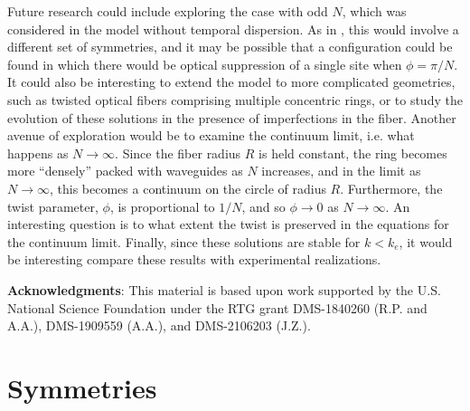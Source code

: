 \documentclass[11pt,reqno]{amsart}
\begin{document}
Future research could include exploring the case with odd $N$, which was considered in the model without temporal dispersion. As in \cite{parker2021}, this would involve a different set of symmetries, and it may be possible that a configuration could be found in which there would be optical suppression of a single site when $\phi = \pi/N$. It could also be interesting to extend the model to more complicated geometries, such as twisted optical fibers comprising multiple concentric rings, or to study the evolution of these solutions in the presence of imperfections in the fiber. Another avenue of exploration would be to examine the continuum limit, i.e. what happens as $N \rightarrow \infty$. Since the fiber radius $R$ is held constant, the ring becomes more ``densely'' packed with waveguides as $N$ increases, and in the limit as $N \rightarrow \infty$, this becomes a continuum on the circle of radius $R$. Furthermore, the twist parameter, $\phi$, is proportional to $1/N$, and so $\phi \rightarrow 0$ as $N \rightarrow \infty$. An interesting question is to what extent the twist is preserved in the equations for the continuum limit. Finally, since these solutions are stable for $k < k_e$, it would be interesting compare these results with experimental realizations.

\vspace{0.5cm}
\textbf{Acknowledgments}: 
This material is based upon work supported by the U.S. National Science Foundation under the RTG grant DMS-1840260 (R.P. and A.A.), DMS-1909559 (A.A.), and DMS-2106203 (J.Z.). 

\appendix

\section{Symmetries}\label{app:symm}
\end{document}
